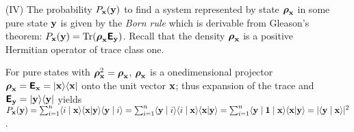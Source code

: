 {\begin{itemize}
{ist, da\ss~ diese zweite Art von Ver\"anderung der $\psi$-Funktion mit
ihrem regelm\"a\ss igen Abrollen {\em zwischen} zwei Messungen nicht das
mindeste zu tun hat. Die abrupte Ver\"anderung durch die Messung
$\ldots$ ist der interessanteste Punkt der ganzen Theorie. Es ist genau
{\em der} Punkt, der den Bruch mit dem naiven Realismus verlangt. Aus
{\em diesem} Grund kann man die $\psi$-Funktion {\em nicht} direkt an
die Stelle des Modells oder des Realdings setzen. Und zwar nicht etwa
weil man einem Realding oder einem Modell nicht abrupte unvorhergesehene
\"Anderungen zumuten d\"urfte, sondern weil vom realistischen Standpunkt
die Beobachtung ein Naturvorgang ist wie jeder andere und nicht per se
eine Unterbrechung des regelm\"a\ss igen Naturlaufs hervorrufen darf.
}



The late Schr\"odinger was much more polemic about these issues; compare for instance his remarks in
his {D}ublin Seminars (1949-1955), published in Ref.
\cite{schroedinger-interpretation}, pages 19-20:
{ ``The idea that  [the alternate measurement outcomes] be not alternatives but {\em all} really happening simultaneously
seems lunatic to [the quantum theorist], just {\em impossible.}
He thinks that if the laws of nature took {\em this} form for,
let me say,
a quarter of an hour, we should find our surroundings rapidly turning into a quagmire, a sort of a featureless jelly or plasma,
all contours becoming blurred, we ourselves probably becoming jelly fish.
It is strange that he should believe this.
For I understand he grants that unobserved nature does behave this way -- namely according to the wave equation.
$\ldots$ according to the quantum theorist, nature is prevented from rapid
jellification only by our perceiving or observing it.''}


\item[(IV)]
The probability $P_{{\bf x}}({\bf y})$ to find a system represented by state ${    {\boldsymbol{\rho}}}_{\bf x}$
in some pure state ${\bf y}$  is given by  the
{\em Born rule}
which is derivable from Gleason's theorem:
$P_{{\bf x}}({\bf y})=\textrm{Tr} ({    {\boldsymbol{\rho}}}_{{\bf x}}\textsf{\textbf{E}}_{\bf y})  $.
Recall that   the density ${    {\boldsymbol{\rho}}}_{{\bf x}}$ is a positive Hermitian operator of trace class one.

For pure states with ${    {\boldsymbol{\rho}}}_{{\bf x}}^2={    {\boldsymbol{\rho}}}_{{\bf x}}$, ${    {\boldsymbol{\rho}}}_{{\bf x}}$ is a onedimensional projector
${    {\boldsymbol{\rho}}}_{{\bf x}} =  \textsf{\textbf{E}}_{{\bf x}} =\vert {{\bf x}}\rangle \langle {{\bf x}} \vert$
onto the unit vector ${\bf x}$; thus expansion of the trace
and $ \textsf{\textbf{E}}_{{\bf y}} =\vert {{\bf y}}\rangle \langle {{\bf y}} \vert$ yields
$P_{{\bf x}}({\bf y})=
\sum_{i=1}^n \langle i \mid   {{\bf x}}\rangle \langle {{\bf x}} \vert  {\bf y}\rangle \langle {\bf y} \mid  i  \rangle =
\sum_{i=1}^n \langle {\bf y} \mid  i  \rangle \langle i \mid   {{\bf x}}\rangle \langle {{\bf x}} \vert  {\bf y}\rangle =
\sum_{i=1}^n \langle {\bf y} \mid {\bf 1} \mid   {{\bf x}}\rangle \langle {{\bf x}} \vert  {\bf y}\rangle =
\vert \langle {\bf y} \mid {\bf x} \rangle \vert^2 $.



\end{itemize}}
